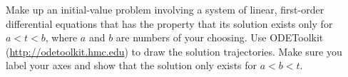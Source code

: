 \documentclass[12pt,letterpaper]{hmcpset}
\begin{document}
\begin{problem}[6]
    Make up an initial-value problem involving a system of linear,
    first-order differential equations that has the property that its
    solution exists only for $a<t<b$, where $a$ and $b$ are numbers of
    your choosing.  Use ODEToolkit (\url{http://odetoolkit.hmc.edu})
    to draw the solution trajectories. Make sure you label your axes
    and show that the solution only exists for $a<b<t$.
\end{problem}
\begin{solution}
    \vfill
\end{solution}
\end{document}
